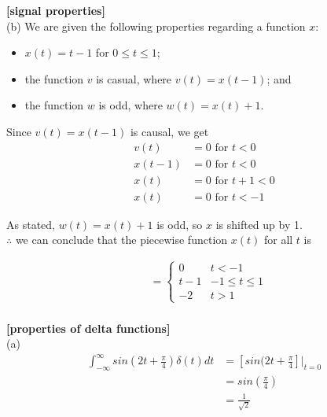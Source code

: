 \documentclass{article}
\begin{document}
 {\bf [signal properties]}\\
(b)
We are given the following properties regarding a function $x$:
\begin{itemize}
  \item $x(t) = t - 1$ for $0 \leq t \leq 1$;
  \item the function $v$ is casual, where $v(t) = x(t - 1)$; and
  \item the function $w$ is odd, where $w(t) = x(t) + 1$.
\end{itemize}
Since $v(t) = x(t - 1)$ is causal, we get
\begin{equation*}
\begin{split}
    v(t) &= 0 \text{ for $t < 0$}\\
    x(t - 1) &= 0 \text{ for $t < 0$}\\
    x(t) &= 0 \text{ for $t + 1 < 0$}\\
    x(t) &= 0 \text{ for $t < -1$}
\end{split}
\end{equation*} 

As stated, $w(t) = x(t) + 1$ is odd, so $x$ is shifted up by 1.\\

$\therefore$ we can conclude that the piecewise function $x(t)$ for all $t$ is

\begin{equation*}
\begin{split}
    &= \begin{cases}
        0 & t < -1\\
        t - 1 & -1 \leq t \leq 1\\
        -2 & t > 1
    \end{cases}\\
\end{split}
\end{equation*}


 {\bf [properties of delta functions]}\\
(a)
\begin{equation*}
\begin{split}
    \int_{-\infty}^{\infty} sin(2t + \frac{\pi}{4}) \delta(t) dt
    &= [sin(2t + \frac{\pi}{4}] \big|_{t=0} \\
    &= sin(\frac{\pi}{4})\\
    &= \frac{1}{\sqrt{2}}
\end{split}
\end{equation*}
\end{document}
